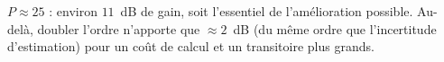 \begin{resultat}
$P\approx 25$ : environ $11$~dB de gain, soit l'essentiel de l'amélioration possible. Au-delà, doubler l'ordre n'apporte que $\approx 2$~dB (du même ordre que l'incertitude d'estimation) pour un coût de calcul et un transitoire plus grands.
\end{resultat}
